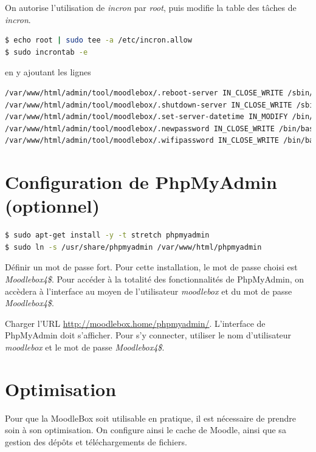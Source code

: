 \documentclass[11pt]{article}
\begin{document}
On autorise l'utilisation de \emph{incron} par \emph{root}, puis modifie la table des tâches de \emph{incron}.

\begin{lstlisting}[language=bash]
$ echo root | sudo tee -a /etc/incron.allow
$ sudo incrontab -e
\end{lstlisting}

en y ajoutant les lignes
\begin{lstlisting}[language=bash]
/var/www/html/admin/tool/moodlebox/.reboot-server IN_CLOSE_WRITE /sbin/shutdown -r now
/var/www/html/admin/tool/moodlebox/.shutdown-server IN_CLOSE_WRITE /sbin/shutdown -h now
/var/www/html/admin/tool/moodlebox/.set-server-datetime IN_MODIFY /bin/bash /var/www/html/admin/tool/moodlebox/.set-server-datetime
/var/www/html/admin/tool/moodlebox/.newpassword IN_CLOSE_WRITE /bin/bash /var/www/html/admin/tool/moodlebox/bin/changepassword.sh
/var/www/html/admin/tool/moodlebox/.wifipassword IN_CLOSE_WRITE /bin/bash /var/www/html/admin/tool/moodlebox/bin/setwifipassword.sh
\end{lstlisting}


\section{Configuration de PhpMyAdmin (optionnel)}

\begin{lstlisting}[language=bash]
$ sudo apt-get install -y -t stretch phpmyadmin
$ sudo ln -s /usr/share/phpmyadmin /var/www/html/phpmyadmin
\end{lstlisting}
Définir un mot de passe fort. Pour cette installation, le mot de passe choisi est \emph{Moodlebox4\$}. Pour accéder à la totalité des fonctionnalités de PhpMyAdmin, on accèdera à l'interface au moyen de l'utilisateur \emph{moodlebox} et du mot de passe \emph{Moodlebox4\$}.

\begin{verification}
Charger l'URL \url{http://moodlebox.home/phpmyadmin/}. L'interface de PhpMyAdmin doit s'afficher. Pour s'y connecter, utiliser le nom d'utilisateur \emph{moodlebox} et le mot de passe \emph{Moodlebox4\$}.
\end{verification}

\section{Optimisation}

Pour que la MoodleBox soit utilisable en pratique, il est nécessaire de prendre soin à son optimisation. On configure ainsi le cache de Moodle, ainsi que sa gestion des dépôts et téléchargements de fichiers.
\end{document}
